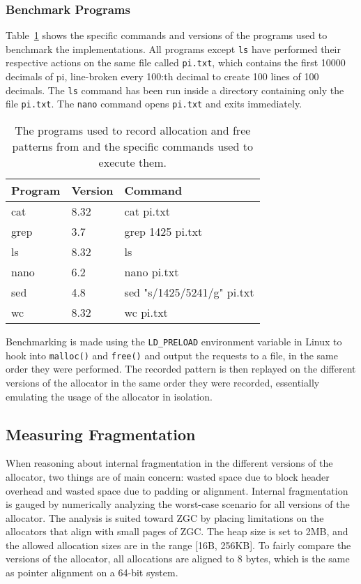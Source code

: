 \subsubsection{Benchmark Programs}

Table~\ref{table:pattern-programs} shows the specific commands and versions of the programs used to benchmark the implementations. All programs except \texttt{ls} have performed their respective actions on the same file called \texttt{pi.txt}, which contains the first 10000 decimals of pi, line-broken every 100:th decimal to create 100 lines of 100 decimals. The \texttt{ls} command has been run inside a directory containing only the file \texttt{pi.txt}. The \texttt{nano} command opens \texttt{pi.txt} and exits immediately.

\begin{table}[H]
\centering
\begin{tabular}{llp{10.4cm}}
\textbf{Program} & \textbf{Version} & \textbf{Command} \\ \hline
cat  & 8.32 & cat pi.txt\\ \hline
grep & 3.7  & grep 1425 pi.txt\\ \hline
ls   & 8.32 & ls \\ \hline
nano & 6.2  & nano pi.txt\\ \hline
sed  & 4.8  & sed "s/1425/5241/g" pi.txt\\ \hline
wc   & 8.32 & wc pi.txt\\
\end{tabular}
\caption{The programs used to record allocation and free patterns from and the specific commands used to execute them.}
\label{table:pattern-programs}
\end{table}

Benchmarking is made using the \texttt{LD\_PRELOAD} environment variable in Linux to hook into \texttt{malloc()} and \texttt{free()} and output the requests to a file, in the same order they were performed. The recorded pattern is then replayed on the different versions of the allocator in the same order they were recorded, essentially emulating the usage of the allocator in isolation.

\subsection{Measuring Fragmentation}

When reasoning about internal fragmentation in the different versions of the allocator, two things are of main concern: wasted space due to block header overhead and wasted space due to padding or alignment. Internal fragmentation is gauged by numerically analyzing the worst-case scenario for all versions of the allocator. The analysis is suited toward ZGC by placing limitations on the allocators that align with small pages of ZGC. The heap size is set to 2MB, and the allowed allocation sizes are in the range [16B, 256KB]. To fairly compare the versions of the allocator, all allocations are aligned to 8 bytes, which is the same as pointer alignment on a 64-bit system.


